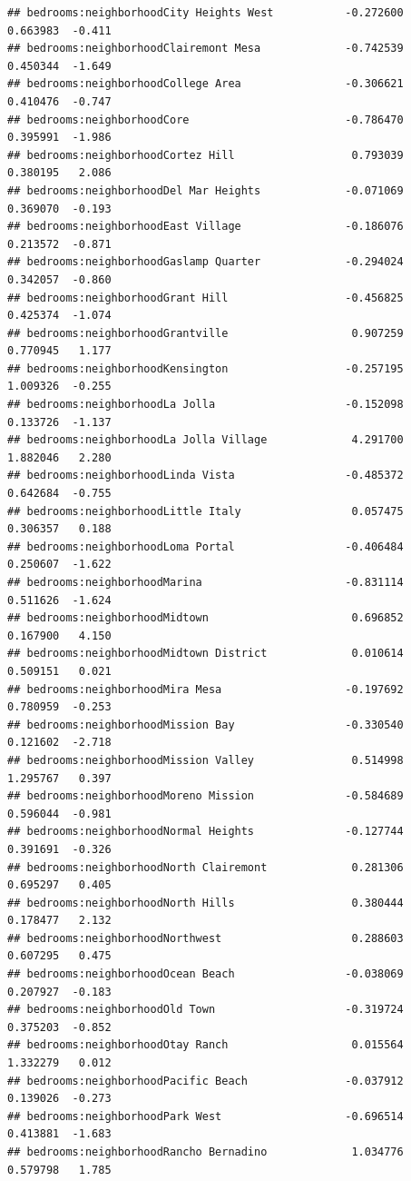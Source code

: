 \documentclass[
]{book}
\begin{document}
\begin{verbatim}
## bedrooms:neighborhoodCity Heights West           -0.272600   0.663983  -0.411
## bedrooms:neighborhoodClairemont Mesa             -0.742539   0.450344  -1.649
## bedrooms:neighborhoodCollege Area                -0.306621   0.410476  -0.747
## bedrooms:neighborhoodCore                        -0.786470   0.395991  -1.986
## bedrooms:neighborhoodCortez Hill                  0.793039   0.380195   2.086
## bedrooms:neighborhoodDel Mar Heights             -0.071069   0.369070  -0.193
## bedrooms:neighborhoodEast Village                -0.186076   0.213572  -0.871
## bedrooms:neighborhoodGaslamp Quarter             -0.294024   0.342057  -0.860
## bedrooms:neighborhoodGrant Hill                  -0.456825   0.425374  -1.074
## bedrooms:neighborhoodGrantville                   0.907259   0.770945   1.177
## bedrooms:neighborhoodKensington                  -0.257195   1.009326  -0.255
## bedrooms:neighborhoodLa Jolla                    -0.152098   0.133726  -1.137
## bedrooms:neighborhoodLa Jolla Village             4.291700   1.882046   2.280
## bedrooms:neighborhoodLinda Vista                 -0.485372   0.642684  -0.755
## bedrooms:neighborhoodLittle Italy                 0.057475   0.306357   0.188
## bedrooms:neighborhoodLoma Portal                 -0.406484   0.250607  -1.622
## bedrooms:neighborhoodMarina                      -0.831114   0.511626  -1.624
## bedrooms:neighborhoodMidtown                      0.696852   0.167900   4.150
## bedrooms:neighborhoodMidtown District             0.010614   0.509151   0.021
## bedrooms:neighborhoodMira Mesa                   -0.197692   0.780959  -0.253
## bedrooms:neighborhoodMission Bay                 -0.330540   0.121602  -2.718
## bedrooms:neighborhoodMission Valley               0.514998   1.295767   0.397
## bedrooms:neighborhoodMoreno Mission              -0.584689   0.596044  -0.981
## bedrooms:neighborhoodNormal Heights              -0.127744   0.391691  -0.326
## bedrooms:neighborhoodNorth Clairemont             0.281306   0.695297   0.405
## bedrooms:neighborhoodNorth Hills                  0.380444   0.178477   2.132
## bedrooms:neighborhoodNorthwest                    0.288603   0.607295   0.475
## bedrooms:neighborhoodOcean Beach                 -0.038069   0.207927  -0.183
## bedrooms:neighborhoodOld Town                    -0.319724   0.375203  -0.852
## bedrooms:neighborhoodOtay Ranch                   0.015564   1.332279   0.012
## bedrooms:neighborhoodPacific Beach               -0.037912   0.139026  -0.273
## bedrooms:neighborhoodPark West                   -0.696514   0.413881  -1.683
## bedrooms:neighborhoodRancho Bernadino             1.034776   0.579798   1.785

\end{verbatim}
\end{document}
